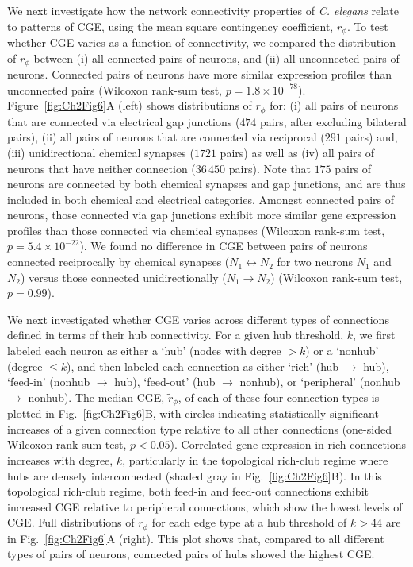 We next investigate how the network connectivity properties of \emph{C. elegans} relate to patterns of CGE, using the mean square contingency coefficient, $r_\phi$.
To test whether CGE varies as a function of connectivity, we compared the distribution of $r_\phi$ between
(i) all connected pairs of neurons, and
(ii) all unconnected pairs of neurons.
Connected pairs of neurons have more similar expression profiles than unconnected pairs (Wilcoxon rank-sum test, $p = 1.8 \times 10^{-78}$).
Figure~\ref{fig:Ch2Fig6}A (left) shows distributions of $r_\phi$ for:
(i) all pairs of neurons that are connected via electrical gap junctions ($474$ pairs, after excluding bilateral pairs),
(ii) all pairs of neurons that are connected via reciprocal ($291$ pairs) and,
(iii) unidirectional chemical synapses ($1721$ pairs) as well as
(iv) all pairs of neurons that have neither connection ($36\,450$ pairs).
Note that $175$ pairs of neurons are connected by both chemical synapses and gap junctions, and are thus included in both chemical and electrical categories.
Amongst connected pairs of neurons, those connected via gap junctions exhibit more similar gene expression profiles than those connected via chemical synapses (Wilcoxon rank-sum test, $p = 5.4 \times 10^{-22}$).
We found no difference in CGE between pairs of neurons connected reciprocally by chemical synapses ($N_1 \leftrightarrow N_2$ for two neurons $N_1$ and $N_2$) versus those connected unidirectionally ($N_1 \rightarrow N_2$) (Wilcoxon rank-sum test, $p = 0.99$).

We next investigated whether CGE varies across different types of connections defined in terms of their hub connectivity.
For a given hub threshold, $k$, we first labeled each neuron as either a `hub' (nodes with degree $> k$) or a `nonhub' (degree $\leq k$), and then labeled each connection as either `rich' (hub $\rightarrow$ hub), `feed-in' (nonhub $\rightarrow$ hub), `feed-out' (hub $\rightarrow$ nonhub), or `peripheral' (nonhub $\rightarrow$ nonhub).
The median CGE, $\tilde{r}_\phi$, of each of these four connection types is plotted in Fig.~\ref{fig:Ch2Fig6}B, with circles indicating statistically significant increases of a given connection type relative to all other connections (one-sided Wilcoxon rank-sum test, $p < 0.05$).
Correlated gene expression in rich connections increases with degree, $k$, particularly in the topological rich-club regime where hubs are densely interconnected (shaded gray in Fig.~\ref{fig:Ch2Fig6}B).
In this topological rich-club regime, both feed-in and feed-out connections exhibit increased CGE relative to peripheral connections, which show the lowest levels of CGE.
Full distributions of $r_\phi$ for each edge type at a hub threshold of $k > 44$ are in Fig.~\ref{fig:Ch2Fig6}A (right).
This plot shows that, compared to all different types of pairs of neurons, connected pairs of hubs showed the highest CGE.

